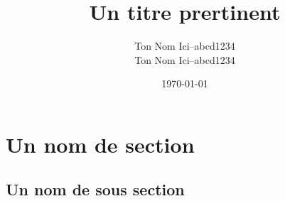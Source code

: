 \documentclass[a4paper, 11pt]{article}
\title{Un titre prertinent}
\author{
  \addtolength{\tabcolsep}{-0.4em}
  \begin{tabular}{rcl} %
    Ton Nom Ici      & -- & abcd1234 \\
    Ton Nom Ici      & -- & abcd1234
  \end{tabular}
}
\date{\today}
\begin{document}
\maketitle
{}
\newpage

\tableofcontents



\newpage
{}

\section{Un nom de section}

\subsection{Un nom de sous section}


\printbibliography[]
\end{document}
